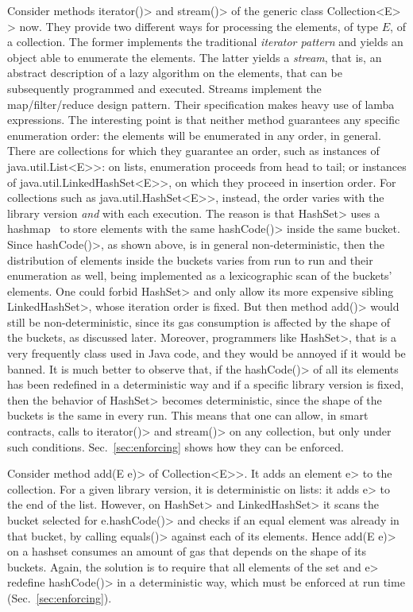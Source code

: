 Consider methods \<iterator()> and \<stream()> of the generic class
\<Collection$\text{<}$E$\text{>}$> now. They provide two different ways for
processing the elements, of type $E$, of a collection. The former implements
the traditional \emph{iterator pattern} and yields an object able to enumerate
the elements. The latter yields a \emph{stream}, that is,
an abstract description of a lazy algorithm on the
elements, that can be subsequently programmed and executed.
Streams implement the map/filter/reduce design pattern. Their specification
makes heavy use of lamba expressions.
The interesting point is that neither method
guarantees any specific enumeration order: the elements will be
enumerated in any order, in general. There are collections for which they
guarantee an order, such as instances of \<java.util.List$\text{<}$E$\text{>}$>:
on lists, enumeration proceeds from head to tail;
or instances of \<java.util.LinkedHashSet$\text{<}$E$\text{>}$>, on which they proceed in
insertion order.
For collections such as \<java.util.HashSet$\text{<}$E$\text{>}$>, instead, the order
varies with the library version \emph{and} with each execution. The reason is that
\<HashSet> uses a hashmap~\cite{CormenLRS09}
to store elements with the same \<hashCode()> inside the same bucket.
Since \<hashCode()>, as shown above, is in general non-deterministic, then
the distribution of elements inside the buckets varies from run to run and their enumeration
as well, being implemented as a lexicographic scan of the buckets' elements.
One could forbid \<HashSet> and only allow its
more expensive sibling \<LinkedHashSet>, whose iteration order is fixed.
But then method \<add()> would still be non-deterministic, since its gas consumption
is affected by the shape of the buckets, as discussed later.
Moreover, programmers like \<HashSet>, that is a very frequently class used
in Java code, and they would be annoyed if it would be
banned. It is much better to observe that,
if the \<hashCode()> of all its elements has been redefined in a deterministic way
and if a specific library version is fixed, then the behavior of \<HashSet> becomes
deterministic, since the shape of the buckets is the same in every run. This means that one
can allow, in smart contracts, calls to \<iterator()> and \<stream()> on any collection,
but only under such conditions. Sec.~\ref{sec:enforcing} shows how they can be enforced.

Consider method \<add(E e)> of \<Collection$\text{<}$E$\text{>}$>.
It adds an element \<e> to the collection. For a given library version,
it is deterministic on lists: it adds \<e> to the end of the list.
However, on \<HashSet> and \<LinkedHashSet> it scans the bucket selected
for \<e.hashCode()> and checks if an equal element was already in that
bucket, by calling \<equals()> against each of its elements. Hence \<add(E e)>
on a hashset consumes an amount of gas that depends on the shape of its buckets.
Again, the solution is to require that all elements of the set and \<e> redefine
\<hashCode()> in a deterministic way, which must be enforced at run time
(Sec.~\ref{sec:enforcing}).

